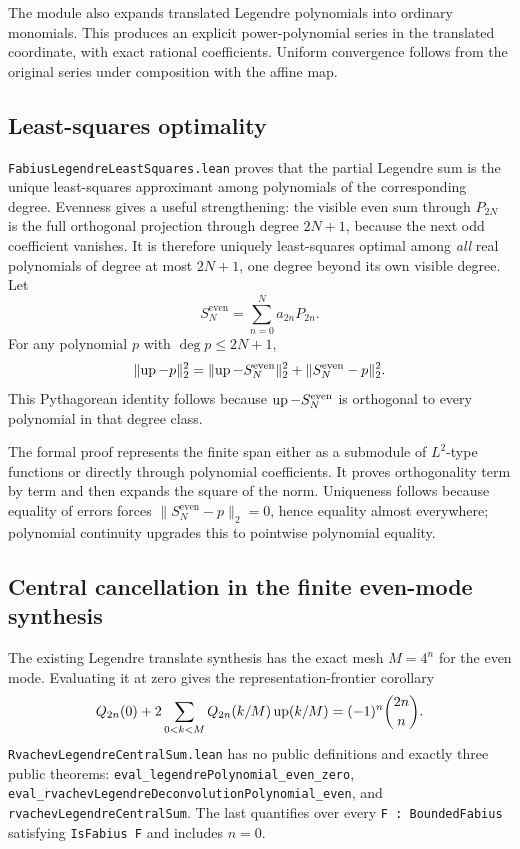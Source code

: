 \documentclass[11pt,oneside]{article}
\theoremstyle{definition}
\theoremstyle{remark}
\begin{document}
The module also expands translated Legendre polynomials into ordinary monomials.  This produces an explicit power-polynomial series in the translated coordinate, with exact rational coefficients.  Uniform convergence follows from the original series under composition with the affine map.

\subsection{Least-squares optimality}
\nolinkurl{FabiusLegendreLeastSquares.lean} proves that the partial Legendre sum is the unique least-squares approximant among polynomials of the corresponding degree.  Evenness gives a useful strengthening: the visible even sum through \(P_{2N}\) is the full orthogonal projection through degree \(2N+1\), because the next odd coefficient vanishes.  It is therefore uniquely least-squares optimal among \emph{all} real polynomials of degree at most \(2N+1\), one degree beyond its own visible degree.  Let
\[
  S_N^{\mathrm{even}}=\sum_{n=0}^{N}a_{2n}P_{2n}.
\]
For any polynomial \(p\) with \(\deg p\leq2N+1\),
\[
  \lVert\operatorname{up}-p\rVert_2^2
  =\lVert\operatorname{up}-S_N^{\mathrm{even}}\rVert_2^2
   +\lVert S_N^{\mathrm{even}}-p\rVert_2^2.
\]
This Pythagorean identity follows because
\(\operatorname{up}-S_N^{\mathrm{even}}\) is orthogonal to every polynomial in that
degree class.

The formal proof represents the finite span either as a submodule of \(L^2\)-type functions or directly through polynomial coefficients.  It proves orthogonality term by term and then expands the square of the norm.  Uniqueness follows because equality of errors forces
\(\lVert S_N^{\mathrm{even}}-p\rVert_2=0\), hence equality almost everywhere;
polynomial continuity upgrades this to pointwise polynomial equality.

\subsection{Central cancellation in the finite even-mode synthesis}
The existing Legendre translate synthesis has the exact mesh \(M=4^n\) for
the even mode.  Evaluating it at zero gives the representation-frontier
corollary
\[
 Q_{2n}(0)+2\sum_{0<k<M}Q_{2n}(k/M)\operatorname{up}(k/M)
 =(-1)^n\binom{2n}{n}.
\]
\nolinkurl{RvachevLegendreCentralSum.lean} has no public definitions and
exactly three public theorems:
\nolinkurl{eval_legendrePolynomial_even_zero},
\nolinkurl{eval_rvachevLegendreDeconvolutionPolynomial_even}, and
\nolinkurl{rvachevLegendreCentralSum}.  The last quantifies over every
\nolinkurl{F : BoundedFabius} satisfying \nolinkurl{IsFabius F} and includes
\(n=0\).
\end{document}
